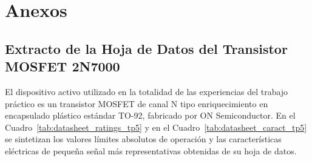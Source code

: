 \chapter{Anexos}
\label{chap:anexos}

\section{Extracto de la Hoja de Datos del Transistor MOSFET 2N7000}

El dispositivo activo utilizado en la totalidad de las experiencias del trabajo práctico es un transistor MOSFET de
canal N tipo enriquecimiento en encapsulado plástico estándar TO-92, fabricado por ON Semiconductor. En el
Cuadro~\ref{tab:datasheet_ratings_tp5} y en el Cuadro~\ref{tab:datasheet_caract_tp5} se sintetizan los valores límites
absolutos de operación y las características eléctricas de pequeña señal más representativas obtenidas de su hoja de datos.

\begin{table}[!ht]
  \centering
  \caption{Límites máximos absolutos de operación del MOSFET 2N7000 (ON Semiconductor).}
  \label{tab:datasheet_ratings_tp5}
\end{table}

